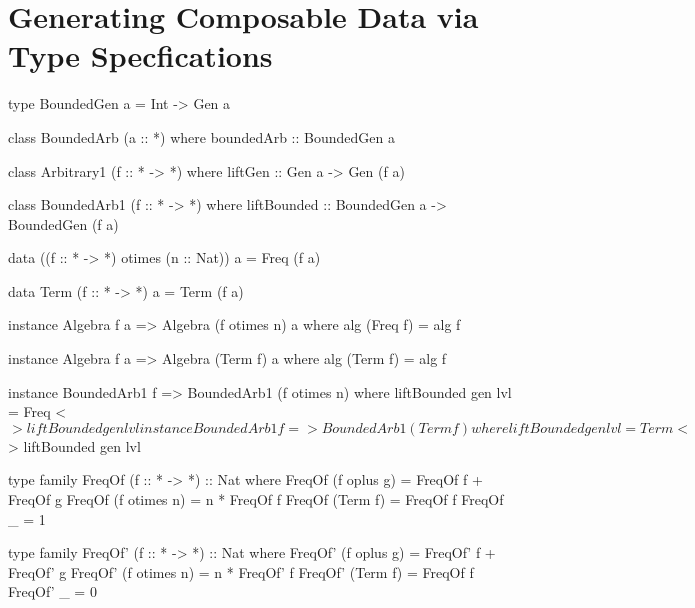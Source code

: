 \section{Generating Composable Data via Type Specfications}
\label{sec:generators}


\begin{code}
type BoundedGen a = Int -> Gen a

class BoundedArb (a :: *) where
  boundedArb :: BoundedGen a
\end{code}


\begin{code}
class Arbitrary1 (f :: * -> *) where
  liftGen :: Gen a -> Gen (f a)
\end{code}

\begin{code}
class BoundedArb1 (f :: * -> *) where
  liftBounded :: BoundedGen a -> BoundedGen (f a)
\end{code}

\begin{code}
data ((f :: * -> *) otimes (n :: Nat)) a = Freq (f a)
\end{code}

\begin{code}
data Term (f :: * -> *) a = Term (f a)
\end{code}

\begin{code}
instance Algebra f a => Algebra (f otimes n) a
  where alg (Freq f) = alg f
\end{code}

\begin{code}
instance Algebra f a => Algebra (Term f) a
  where alg (Term f) = alg f
\end{code}


\begin{code}
instance BoundedArb1 f => BoundedArb1 (f otimes n) where
  liftBounded gen lvl = Freq <$> liftBounded gen lvl

instance BoundedArb1 f => BoundedArb1 (Term f) where
  liftBounded gen lvl = Term <$> liftBounded gen lvl
\end{code}


\begin{code}
type family FreqOf (f :: * -> *) :: Nat where
  FreqOf (f oplus g)   = FreqOf f + FreqOf g
  FreqOf (f otimes n)  = n * FreqOf f
  FreqOf (Term f)      = FreqOf f
  FreqOf _             = 1
\end{code}

\begin{code}
type family FreqOf' (f :: * -> *) :: Nat where
  FreqOf' (f oplus g)   = FreqOf' f  +  FreqOf' g
  FreqOf' (f otimes n)  = n  *  FreqOf' f
  FreqOf' (Term f)      = FreqOf f
  FreqOf' _             = 0
\end{code}


